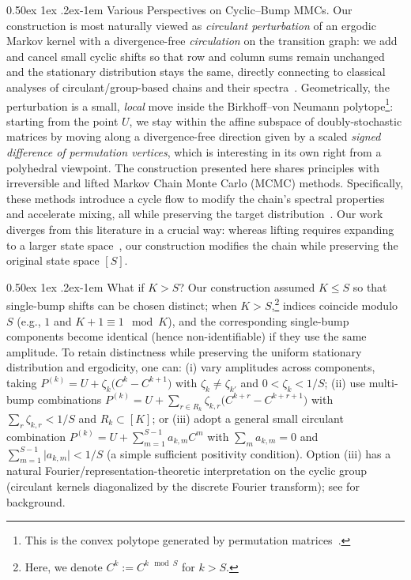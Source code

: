 \documentclass[twoside]{article}
\makeatletter
\renewcommand{\paragraph}{%
  \@startsection{paragraph}{4}%
  {\z@}{0.50ex \@plus 1ex \@minus .2ex}{-1em}%
  {\normalfont\normalsize\bfseries}%
}
\theoremstyle{plain}
\makeatother
\begin{document}
\paragraph{Various Perspectives on Cyclic–Bump MMCs.}
Our construction is most naturally viewed as \emph{circulant perturbation} of an ergodic Markov kernel with a divergence-free \emph{circulation} on the transition graph: we add and cancel small cyclic shifts so that row and column sums remain unchanged and the stationary distribution stays the same, directly connecting to classical analyses of circulant/group-based chains and their spectra~\citep{diaconis1988,markovmixing}.
Geometrically, the perturbation is a small, \emph{local} move inside the Birkhoff--von Neumann polytope\footnote{This is the convex polytope generated by permutation matrices~\citep{birkhoff1946Tres}.}: starting from the point $U$, we stay within the affine subspace of doubly-stochastic matrices by moving along a divergence-free direction given by a scaled \emph{signed difference of permutation vertices}, which is interesting in its own right from a polyhedral viewpoint.
The construction presented here shares principles with irreversible and lifted Markov Chain Monte Carlo (MCMC) methods. Specifically, these methods introduce a cycle flow to modify the chain's spectral properties and accelerate mixing, all while preserving the target distribution~\citep{chen1999lifting,diaconis1988}. Our work diverges from this literature in a crucial way: whereas lifting requires expanding to a larger state space~\citep{chen1999lifting}, our construction modifies the chain while preserving the original state space $[S]$.


\paragraph{What if $K> S$?}
Our construction assumed $K\le S$ so that single-bump shifts can be chosen distinct; when $K>S$,\footnote{Here, we denote $C^k := C^{k \mod{S}}$ for $k > S$.} indices coincide modulo $S$ (e.g., $1$ and $K + 1 \equiv 1 \mod{K}$), and the corresponding single-bump components become identical (hence non-identifiable) if they use the same amplitude.
To retain distinctness while preserving the uniform stationary distribution and ergodicity, one can: (i) vary amplitudes across components, taking
$P^{(k)} = U + \zeta_k \big(C^{k} - C^{k+1}\big)$ with $\zeta_k \neq \zeta_{k'}$ and $0 < \zeta_k < 1/S$; (ii) use multi-bump combinations
$P^{(k)} = U + \sum_{r \in R_k} \zeta_{k,r}\big(C^{k+r}-C^{k+r+1}\big)$
with $\sum_r \zeta_{k,r} < 1/S$ and $R_k \subset [K]$; or (iii) adopt a general small circulant combination
$P^{(k)} = U + \sum_{m=1}^{S-1} a_{k,m} C^{m}$ with $\sum_m a_{k,m}=0$ and $\sum_{m=1}^{S-1}\lvert a_{k,m}\rvert < 1/S$ (a simple sufficient positivity condition). Option (iii) has a natural Fourier/representation-theoretic interpretation on the cyclic group (circulant kernels diagonalized by the discrete Fourier transform); see \citet{diaconis1988} for background.
\end{document}
